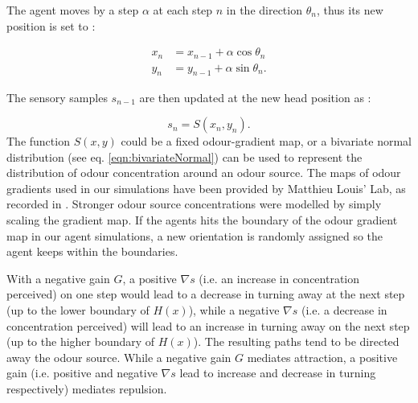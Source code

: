 \documentclass[11pt,a4paper]{article}
\begin{document}
The agent moves by a step $\alpha$ at each step $n$ in the direction $\theta_n$, thus its new position is set to :

\begin{align}
x_n &= x_{n-1}+ \alpha \cos \theta_{n} \\
y_n &= y_{n-1}+ \alpha  \sin \theta_{n}.
\end{align}

The sensory samples $s_{n-1}$ are then updated at the new head position as :

\begin{equation}
s_n = S(x_n,y_n).
\end{equation}
The function $S(x,y)$ could be a  fixed odour-gradient map, or a bivariate normal distribution (see eq. \eqref{eqn:bivariateNormal}) can be used to represent the distribution of odour concentration around an odour source. 
 The maps of odour gradients used in our simulations have been provided by Matthieu Louis' Lab, as recorded in \citep{gomez2014multilevel}. Stronger odour source concentrations were modelled by simply scaling the gradient map.
If the agents hits the boundary of the odour gradient map in our agent simulations, a new  orientation is randomly assigned so the agent keeps within the boundaries.


With a negative gain $G$, a positive $\nabla s$ (i.e. an increase in concentration perceived) on one step would lead to a decrease in turning away at the next step (up to the lower boundary of $H(x)$), while a negative $\nabla s$ (i.e. a decrease in concentration perceived) will lead to an increase in turning away  on the next step (up to the higher boundary of $H(x)$). The resulting paths tend to be directed away the odour source. While a negative gain $G$ mediates attraction, a positive gain (i.e. positive and negative $\nabla s$ lead to increase and decrease in turning respectively) mediates repulsion.


\end{document}
